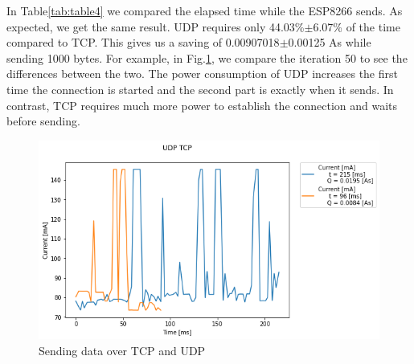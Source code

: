 In Table\ref{tab:table4} we compared the elapsed time while the ESP8266 sends.
As expected, we get the same result.
UDP requires only 44.03\%$\pm$6.07\% of the time compared to TCP.
This gives us a saving of 0.00907018$\pm$0.00125 As while sending 1000 bytes.
For example, in Fig.\ref{fig:udp_tcp_s_m},
we compare the iteration 50 to see the differences between the two.
The power consumption of UDP increases the first time the connection
is started and the second part is exactly when it sends.
In contrast, TCP requires much more power to establish the connection and waits before sending.
\begin{figure}[H]
    \centering
    \includegraphics[width = 1 \linewidth]{fig/udp_tcp/udp_tcp_s_m.png}
    \caption{Sending data over TCP and UDP}
    \label{fig:udp_tcp_s_m}
    \end{figure}